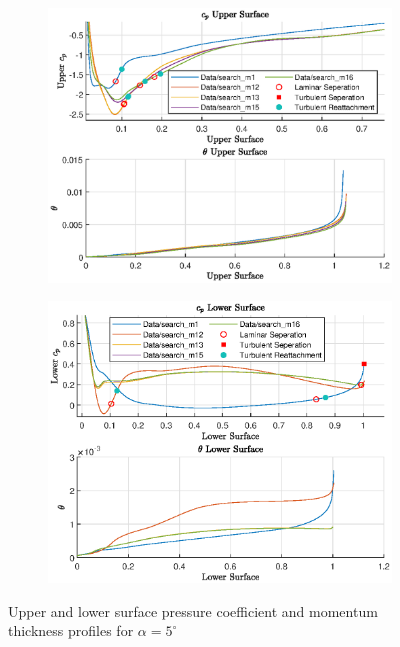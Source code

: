 \documentclass{article}
\begin{document}
\begin{figure}[H]
    \begin{subfigure}{0.49\textwidth}
        \centering
        \includegraphics[width=1.1\textwidth, center]{figures/loRe_upperprofile_16_a5.eps}
        \caption{}
        \label{fig:m16_uprofile}
    \end{subfigure}
    \begin{subfigure}{0.49\textwidth}
        \centering
        \includegraphics[width=1.15\textwidth, center]{figures/loRe_lowerprofile_16_a5.eps}
        \caption{}
        \label{fig:m16_lprofile}
    \end{subfigure}
    \caption{Upper and lower surface pressure coefficient and momentum thickness profiles for $\alpha = 5^\circ$}
\end{figure}
\end{document}
